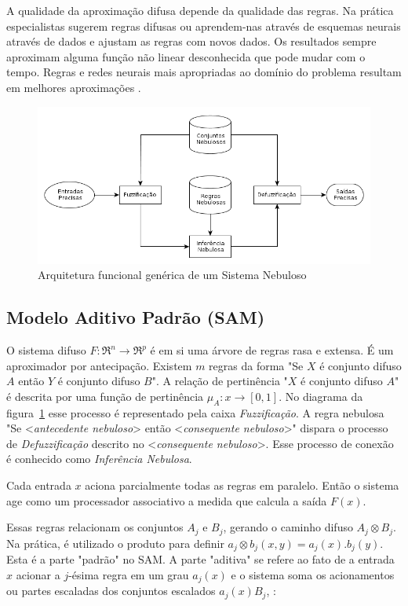 A qualidade da aproximação difusa depende da qualidade das regras. Na prática especialistas sugerem regras
difusas ou aprendem-nas através de esquemas neurais através de dados e ajustam as regras com novos dados.
Os resultados sempre aproximam alguma função não linear desconhecida que pode mudar com o tempo. Regras e redes neurais mais apropriadas ao domínio do problema resultam em melhores aproximações \cite{kosko1997fuzzy}.

\begin{figure}
  \includegraphics[width=15cm]{imgs/arquitetura_fuzzy}
  \caption{Arquitetura funcional genérica de um Sistema Nebuloso \cite{passos2005datamining}}
  \label{arq_fuzzy}
\end{figure}

\subsection{Modelo Aditivo Padrão (SAM)}

O sistema difuso $F:\Re^n \rightarrow \Re^p$ é em si uma árvore de regras rasa e extensa. É um aproximador
por antecipação. Existem $m$ regras da forma "Se $X$ é conjunto difuso $A$ então $Y$ é conjunto difuso $B$".
A relação de pertinência "$X$ é conjunto difuso $A$" é descrita por uma função de pertinência
$\mu_A: x \longrightarrow [0,1]$. No diagrama da figura~\ref{arq_fuzzy} esse processo é representado pela
caixa \emph{Fuzzificação}. A regra nebulosa "Se <\textit{antecedente nebuloso}> então <\textit{consequente nebuloso}>" dispara
o processo de \emph{Defuzzificação} descrito no <\textit{consequente nebuloso}>. Esse processo de conexão é conhecido como
\emph{Inferência Nebulosa}.

Cada entrada $x$ aciona parcialmente todas as regras em paralelo. Então o sistema age como um processador 
associativo a medida que calcula a saída $F(x)$.

Essas regras relacionam os conjuntos $A_j$ e $B_j$, gerando o caminho difuso $A_j \otimes B_j$. Na prática,
é utilizado o produto para definir $ a_j \otimes b_j (x,y) = a_j(x).b_j(y)$. Esta é a parte "padrão" no SAM\@.
A parte "aditiva" se refere ao fato de a entrada $x$ acionar a $j$-ésima regra em um grau $a_j(x)$ e o sistema 
soma os acionamentos ou partes escaladas dos conjuntos escalados $a_j(x)B_j$, \cite{kosko1997fuzzy}:


